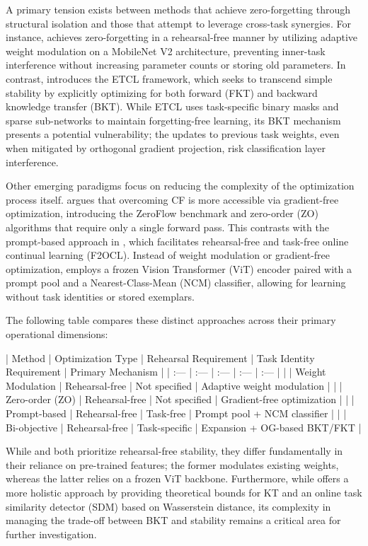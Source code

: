 \documentclass[11pt]{article}
\begin{document}
A primary tension exists between methods that achieve zero-forgetting through structural isolation and those that attempt to leverage cross-task synergies. For instance, \citep{2311.15276} achieves zero-forgetting in a rehearsal-free manner by utilizing adaptive weight modulation on a MobileNet V2 architecture, preventing inner-task interference without increasing parameter counts or storing old parameters. In contrast, \citep{2601.05623} introduces the ETCL framework, which seeks to transcend simple stability by explicitly optimizing for both forward (FKT) and backward knowledge transfer (BKT). While ETCL uses task-specific binary masks and sparse sub-networks to maintain forgetting-free learning, its BKT mechanism presents a potential vulnerability; the updates to previous task weights, even when mitigated by orthogonal gradient projection, risk classification layer interference.

Other emerging paradigms focus on reducing the complexity of the optimization process itself. \citep{2501.01045} argues that overcoming CF is more accessible via gradient-free optimization, introducing the ZeroFlow benchmark and zero-order (ZO) algorithms that require only a single forward pass. This contrasts with the prompt-based approach in \citep{2510.00467}, which facilitates rehearsal-free and task-free online continual learning (F2OCL). Instead of weight modulation or gradient-free optimization, \citep{2510.00467} employs a frozen Vision Transformer (ViT) encoder paired with a prompt pool and a Nearest-Class-Mean (NCM) classifier, allowing for learning without task identities or stored exemplars.

The following table compares these distinct approaches across their primary operational dimensions:

| Method | Optimization Type | Rehearsal Requirement | Task Identity Requirement | Primary Mechanism |
| :--- | :--- | :--- | :--- | :--- |
| \citep{2311.15276} | Weight Modulation | Rehearsal-free | Not specified | Adaptive weight modulation |
| \citep{2501.01045} | Zero-order (ZO) | Rehearsal-free | Not specified | Gradient-free optimization |
| \citep{2510.00467} | Prompt-based | Rehearsal-free | Task-free | Prompt pool + NCM classifier |
| \citep{2601.05623} | Bi-objective | Rehearsal-free | Task-specific | Expansion + OG-based BKT/FKT |

While \citep{2311.15276} and \citep{2510.00467} both prioritize rehearsal-free stability, they differ fundamentally in their reliance on pre-trained features; the former modulates existing weights, whereas the latter relies on a frozen ViT backbone. Furthermore, while \citep{2601.05623} offers a more holistic approach by providing theoretical bounds for KT and an online task similarity detector (SDM) based on Wasserstein distance, its complexity in managing the trade-off between BKT and stability remains a critical area for further investigation.
\end{document}
